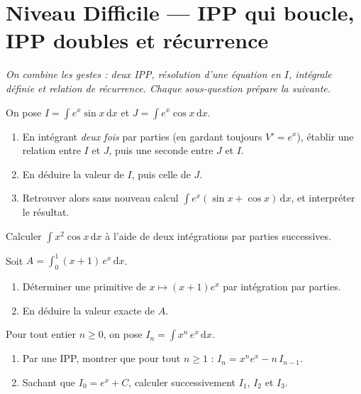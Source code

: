 \documentclass[11pt,a4paper]{article}
\newcommand{\dd}{\mathrm{d}}
\begin{document}
\section*{Niveau Difficile — IPP qui boucle, IPP doubles et récurrence}

\emph{On combine les gestes : deux IPP, résolution d'une équation en $I$, intégrale définie et
relation de récurrence. Chaque sous-question prépare la suivante.}

\begin{exo}
On pose $\displaystyle I=\int e^{x}\sin x\,\dd x$ et $\displaystyle J=\int e^{x}\cos x\,\dd x$.
\begin{enumerate}[label=\textbf{(\alph*)},leftmargin=2.2em,topsep=2pt,itemsep=2pt]
  \item En intégrant \emph{deux fois} par parties (en gardant toujours $V'=e^x$), établir une relation
        entre $I$ et $J$, puis une seconde entre $J$ et $I$.
  \item En déduire la valeur de $I$, puis celle de $J$.
  \item Retrouver alors sans nouveau calcul $\displaystyle\int e^{x}(\sin x+\cos x)\,\dd x$, et interpréter le résultat.
\end{enumerate}
\end{exo}

\begin{exo}
Calculer $\displaystyle \int x^{2}\cos x\,\dd x$ à l'aide de deux intégrations par parties successives.
\end{exo}

\begin{exo}
Soit $\displaystyle A=\int_{0}^{1}(x+1)\,e^{x}\,\dd x$.
\begin{enumerate}[label=\textbf{(\alph*)},leftmargin=2.2em,topsep=2pt,itemsep=2pt]
  \item Déterminer une primitive de $x\mapsto(x+1)e^x$ par intégration par parties.
  \item En déduire la valeur exacte de $A$.
\end{enumerate}
\end{exo}

\begin{exo}
Pour tout entier $n\geqslant 0$, on pose $\displaystyle I_{n}=\int x^{n}\,e^{x}\,\dd x$.
\begin{enumerate}[label=\textbf{(\alph*)},leftmargin=2.2em,topsep=2pt,itemsep=2pt]
  \item Par une IPP, montrer que pour tout $n\geqslant 1$ : $\displaystyle I_{n}=x^{n}e^{x}-n\,I_{n-1}$.
  \item Sachant que $I_{0}=e^{x}+C$, calculer successivement $I_{1}$, $I_{2}$ et $I_{3}$.
\end{enumerate}
\end{exo}
\end{document}
